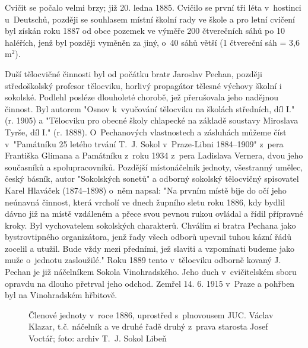 \documentclass[a5paper, 12pt, twoside]{article}
\begin{document}
Cvičit se počalo velmi brzy; již 20. ledna 1885. Cvičilo se první tři léta v~hostinci u~Deutschů, později se souhlasem místní školní rady ve škole a pro letní cvičení byl získán roku 1887 od obce pozemek ve výměře 200 čtverečních sáhů po 10 haléřích, jenž byl později vyměněn za jiný, o~40 sáhů větší (1 čtvereční sáh = 3,6\,$\textrm{m}^2$).

Duší tělocvičné činnosti byl od počátku bratr Jaroslav Pechan, později středoškolský profesor tělocviku, horlivý propagátor tělesné výchovy školní i sokolské. Podlehl posléze dlouholeté chorobě, jež přerušovala jeho nadějnou činnost. Byl autorem "Osnov k~vyučování tělocviku na školách středních, díl I." (r. 1905) a "Tělocviku pro obecné školy chlapecké na základě soustavy Miroslava Tyrše, díl I." (r. 1888). O~Pechanových vlastnostech a zásluhách můžeme číst v~"Památníku 25 letého trvání T.~J.  Sokol v~Praze-Libni 1884–⁠⁠⁠⁠⁠⁠1909" z~pera Františka Glimana a Památníku z~roku 1934 z~pera Ladislava Vernera, dvou jeho současníků a spolupracovníků. Pozdější místonáčelník jednoty, všestranný umělec, český básník, autor "Sokolských sonetů" a odborný sokolský tělocvičný spisovatel Karel Hlaváček (1874–1898) o~něm napsal: "Na prvním místě bije do očí jeho neúnavná činnost, která vrcholí ve dnech župního sletu roku 1886, kdy bydlil dávno již na místě vzdáleném a přece svou pevnou rukou ovládal a řídil přípravné kroky. Byl vychovatelem sokolských  charakterů.  Chválím si bratra Pechana jako bystrovtipného organizátora, jenž řady všech odborů upevnil tuhou kázní řádů zocelil a utužil. Bude vždy mezi předními, jež slaviti a vzpomínati budeme jako muže o~jednotu zasloužilé." Roku 1889 tento v~tělocviku odborně kovaný J. Pechan je již náčelníkem Sokola Vinohradského. Jeho duch v~cvičitelském sboru opravdu na dlouho přetrval jeho odchod. Zemřel 14. 6. 1915 v~Praze a pohřben byl na Vinohradském hřbitově.

\begin{figure*}[h!]
  \centering
  \caption*{Členové jednoty v~roce 1886, uprostřed s~plnovousem JUC. Václav Klazar, t.č. náčelník a ve druhé řadě druhý z~prava starosta Josef Voctář; foto: archiv T.~J. Sokol Libeň}
\end{figure*}
\end{document}
